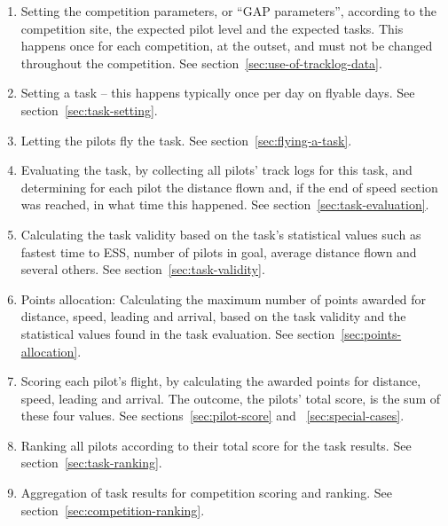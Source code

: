 \documentclass{article}
\begin{document}
\begin{enumerate}
    \item
        Setting the competition parameters, or “GAP parameters”, according to
        the competition site, the expected pilot level and the expected tasks.
        This happens once for each competition, at the outset, and must not be
        changed throughout the competition. See
        section~\ref{sec:use-of-tracklog-data}.
    \item
        Setting a task – this happens typically once per day on flyable days.
        See section~\ref{sec:task-setting}.
    \item
        Letting the pilots fly the task. See section~\ref{sec:flying-a-task}.
    \item
        Evaluating the task, by collecting all pilots’ track logs for this
        task, and determining for each pilot the distance flown and, if the end
        of speed section was reached, in what time this happened. See
        section~\ref{sec:task-evaluation}.
    \item
        Calculating the task validity based on the task’s statistical values
        such as fastest time to ESS, number of pilots in goal, average distance
        flown and several others. See section~\ref{sec:task-validity}.
    \item
        Points allocation: Calculating the maximum number of points awarded for
        distance, speed, leading and arrival, based on the task validity and
        the statistical values found in the task evaluation. See
        section~\ref{sec:points-allocation}.
    \item
        Scoring each pilot’s flight, by calculating the awarded points for
        distance, speed, leading and arrival. The outcome, the pilots’ total
        score, is the sum of these four values. See
        sections~\ref{sec:pilot-score} and ~\ref{sec:special-cases}.
    \item
        Ranking all pilots according to their total score for the task results.
        See section~\ref{sec:task-ranking}.
    \item
        Aggregation of task results for competition scoring and ranking. See
        section~\ref{sec:competition-ranking}.
\end{enumerate}

\newpage
\end{document}
